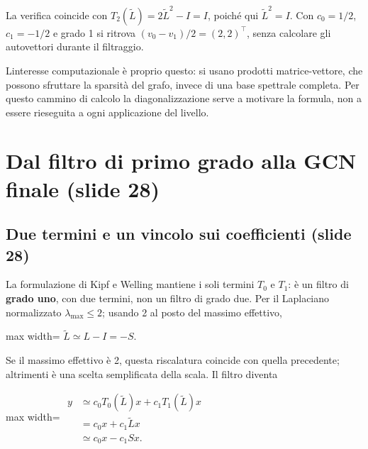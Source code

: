 \documentclass[11pt,a4paper,oneside,openany]{book}
\begin{document}
La verifica coincide con \(T_2(\widetilde L)=2\widetilde L^2-I=I\), poiché qui \(\widetilde L^2=I\). Con \(c_0=1/2\), \(c_1=-1/2\) e grado 1 si ritrova \((v_0-v_1)/2=(2,2)^\top\), senza calcolare gli autovettori durante il filtraggio.

L\textquotesingle interesse computazionale è proprio questo: si usano prodotti matrice-vettore, che possono sfruttare la sparsità del grafo, invece di una base spettrale completa. Per questo cammino di calcolo la diagonalizzazione serve a motivare la formula, non a essere rieseguita a ogni applicazione del livello.

\section{Dal filtro di primo grado alla GCN finale (slide 28)}\label{f05-r494}

\subsection{Due termini e un vincolo sui coefficienti (slide 28)}\label{f05-r496}

La formulazione di Kipf e Welling mantiene i soli termini \(T_0\) e \(T_1\): è un filtro di \textbf{grado uno}, con due termini, non un filtro di grado due. Per il Laplaciano normalizzato \(\lambda_{\max}\le2\); usando 2 al posto del massimo effettivo,

\begin{center}
\begin{adjustbox}{max width=\linewidth}
$\displaystyle \widetilde L\simeq L-I=-S.$
\end{adjustbox}
\end{center}

Se il massimo effettivo è 2, questa riscalatura coincide con quella precedente; altrimenti è una scelta semplificata della scala. Il filtro diventa

\begin{center}
\begin{adjustbox}{max width=\linewidth}
$\displaystyle \begin{aligned}
y&\simeq c_0T_0(\widetilde L)x+c_1T_1(\widetilde L)x\\
&=c_0x+c_1\widetilde Lx\\
&\simeq c_0x-c_1Sx.
\end{aligned}$
\end{adjustbox}
\end{center}
\end{document}
